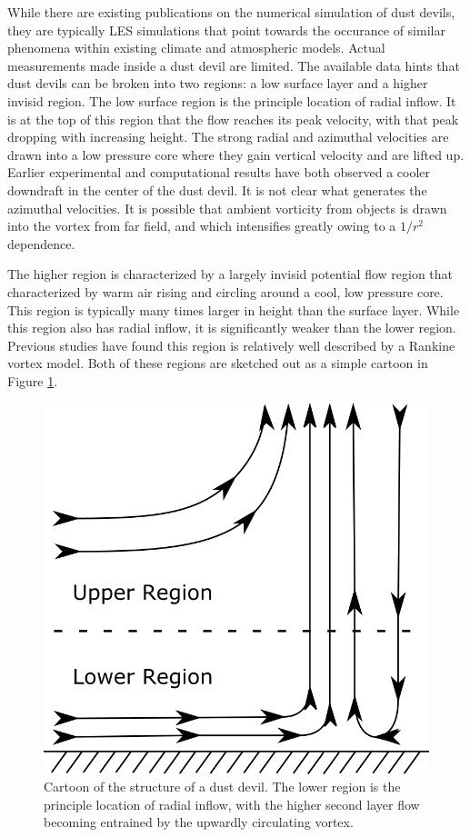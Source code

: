 While there are existing publications on the numerical simulation of dust
devils, they are typically LES simulations that point
towards the occurance of similar phenomena within existing climate and
atmospheric models\cite{QJ:QJ200513160722,doi:10.3137/ao.420105}. Actual
measurements made inside a dust devil 
are limited. The available data hints that dust devils can be broken
into two regions: a low surface layer and a higher invisid region. The
low surface region is the  principle location of radial inflow. 
It is at the top of this region that the flow 
reaches its peak velocity, with that peak dropping with increasing height. 
The strong radial and azimuthal velocities are drawn into a low pressure core 
where they gain vertical velocity and are lifted up. Earlier experimental and 
computational results have both observed a cooler downdraft in the center 
of the dust devil. It is not clear what generates the azimuthal velocities. It is 
possible that ambient vorticity from objects is drawn into the vortex from far 
field, and which intensifies greatly owing to a $1/r^2$ dependence.

The higher region is characterized by a largely invisid potential flow region 
that characterized by warm air rising and circling around a cool, 
low pressure core. This region is typically many times larger in height than the
surface layer. While this region also has radial inflow, it is 
significantly weaker than the lower region. Previous studies have found 
this region is relatively well described by a Rankine vortex
model\cite{Sinclair1973}. Both of these regions are sketched out as a simple 
cartoon in Figure \ref{fig:cartoon}.

  \begin{figure}[!htb]
    \begin{center}
     \includegraphics[width = 10 cm]{figs/ground}
     \caption{Cartoon of the structure of a dust devil. The lower region
     is the principle location of radial inflow, with the higher second
     layer flow becoming entrained by the upwardly circulating vortex. }
     \label{fig:cartoon}
    \end{center}
  \end{figure}


